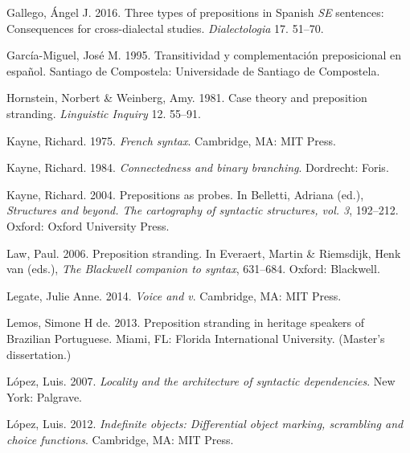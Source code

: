 \documentclass[output=paper]{langsci/langscibook}
\begin{document}
\begin{styleBodyTextIn}
Gallego, Ángel J. 2016. Three types of prepositions in Spanish \textit{SE} sentences: Consequences for cross-dialectal studies. \textit{Dialectologia} 17. 51–70.
\end{styleBodyTextIn}

\begin{styleBodyTextIn}
García-Miguel, José M. 1995. Transitividad y complementación preposicional en español. Santiago de Compostela: Universidade de Santiago de Compostela.
\end{styleBodyTextIn}

\begin{styleBodyTextIn}
Hornstein, Norbert \& Weinberg, Amy. 1981. Case theory and preposition stranding. \textit{Linguistic Inquiry} 12. 55–91.
\end{styleBodyTextIn}

Kayne, Richard. 1975. \textit{French syntax}. Cambridge, MA: MIT Press.

Kayne, Richard. 1984. \textit{Connectedness and binary branching}. Dordrecht: Foris.

Kayne, Richard. 2004. Prepositions as probes. In Belletti, Adriana (ed.), \textit{Structures and beyond. The cartography of syntactic structures, vol. 3}, 192–212. Oxford: Oxford University Press.

\begin{styleTextbodyindent}
Law, Paul. 2006. Preposition stranding. In Everaert, Martin \& Riemsdijk, Henk van (eds.), \textit{The Blackwell companion to syntax}, 631–684. Oxford: Blackwell.
\end{styleTextbodyindent}

\begin{styleTextbodyindent}
Legate, Julie Anne. 2014. \textit{Voice and v}. Cambridge, MA: MIT Press.
\end{styleTextbodyindent}

Lemos, Simone H de. 2013. Preposition stranding in heritage speakers of Brazilian Portuguese. Miami, FL: Florida International University. (Master’s dissertation.)

\begin{styleTextbodyindent}
López, Luis. 2007. \textit{Locality and the architecture of syntactic dependencies}. New York: Palgrave.
\end{styleTextbodyindent}

\begin{styleTextbodyindent}
López, Luis. 2012. \textit{Indefinite objects: Differential object marking, scrambling and choice functions}. Cambridge, MA: MIT Press.
\end{styleTextbodyindent}
\end{document}
